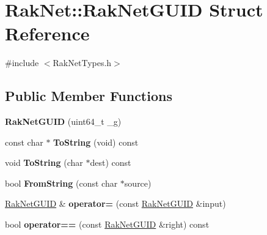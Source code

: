 \hypertarget{struct_rak_net_1_1_rak_net_g_u_i_d}{\section{Rak\-Net\-:\-:Rak\-Net\-G\-U\-I\-D Struct Reference}
\label{struct_rak_net_1_1_rak_net_g_u_i_d}
}


{\ttfamily \#include $<$Rak\-Net\-Types.\-h$>$}

\subsection*{Public Member Functions}
\begin{DoxyCompactItemize}
\item 
\hypertarget{struct_rak_net_1_1_rak_net_g_u_i_d_a59f5c34dbe2320b67cc3bc59f90dffdb}{{\bfseries Rak\-Net\-G\-U\-I\-D} (uint64\-\_\-t \-\_\-g)}\label{struct_rak_net_1_1_rak_net_g_u_i_d_a59f5c34dbe2320b67cc3bc59f90dffdb}

\item 
\hypertarget{struct_rak_net_1_1_rak_net_g_u_i_d_a6a30cee44dc30bfe0ecdbdb951a9a3ae}{const char $\ast$ {\bfseries To\-String} (void) const }\label{struct_rak_net_1_1_rak_net_g_u_i_d_a6a30cee44dc30bfe0ecdbdb951a9a3ae}

\item 
\hypertarget{struct_rak_net_1_1_rak_net_g_u_i_d_a457a17ea665444a9d12439bc0c470bc1}{void {\bfseries To\-String} (char $\ast$dest) const }\label{struct_rak_net_1_1_rak_net_g_u_i_d_a457a17ea665444a9d12439bc0c470bc1}

\item 
\hypertarget{struct_rak_net_1_1_rak_net_g_u_i_d_a6def7c027ae15aaf2d105007607821a8}{bool {\bfseries From\-String} (const char $\ast$source)}\label{struct_rak_net_1_1_rak_net_g_u_i_d_a6def7c027ae15aaf2d105007607821a8}

\item 
\hypertarget{struct_rak_net_1_1_rak_net_g_u_i_d_ab831729c2fe6ed261dd45b217795ced9}{\hyperlink{struct_rak_net_1_1_rak_net_g_u_i_d}{Rak\-Net\-G\-U\-I\-D} \& {\bfseries operator=} (const \hyperlink{struct_rak_net_1_1_rak_net_g_u_i_d}{Rak\-Net\-G\-U\-I\-D} \&input)}\label{struct_rak_net_1_1_rak_net_g_u_i_d_ab831729c2fe6ed261dd45b217795ced9}

\item 
\hypertarget{struct_rak_net_1_1_rak_net_g_u_i_d_a5550cf9c77481bfa5b88dc84cfe228fe}{bool {\bfseries operator==} (const \hyperlink{struct_rak_net_1_1_rak_net_g_u_i_d}{Rak\-Net\-G\-U\-I\-D} \&right) const }\label{struct_rak_net_1_1_rak_net_g_u_i_d_a5550cf9c77481bfa5b88dc84cfe228fe}


\end{DoxyCompactItemize}
